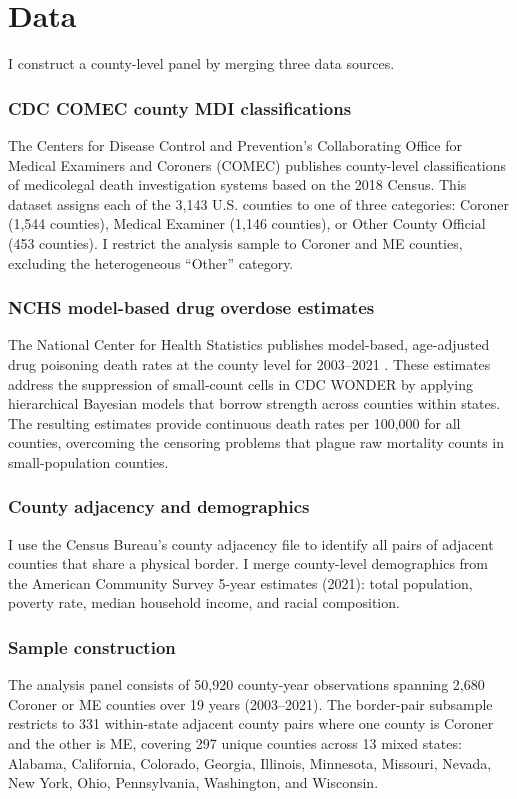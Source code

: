 \documentclass[12pt]{article}
\begin{document}
\section{Data}

I construct a county-level panel by merging three data sources.

\subsubsection*{CDC COMEC county MDI classifications} The Centers for Disease Control and Prevention's Collaborating Office for Medical Examiners and Coroners (COMEC) publishes county-level classifications of medicolegal death investigation systems based on the 2018 Census. This dataset assigns each of the 3,143 U.S. counties to one of three categories: Coroner (1,544 counties), Medical Examiner (1,146 counties), or Other County Official (453 counties). I restrict the analysis sample to Coroner and ME counties, excluding the heterogeneous ``Other'' category.

\subsubsection*{NCHS model-based drug overdose estimates} The National Center for Health Statistics publishes model-based, age-adjusted drug poisoning death rates at the county level for 2003--2021 \citep{nchs_model_od}. These estimates address the suppression of small-count cells in CDC WONDER by applying hierarchical Bayesian models that borrow strength across counties within states. The resulting estimates provide continuous death rates per 100,000 for all counties, overcoming the censoring problems that plague raw mortality counts in small-population counties.

\subsubsection*{County adjacency and demographics} I use the Census Bureau's county adjacency file to identify all pairs of adjacent counties that share a physical border. I merge county-level demographics from the American Community Survey 5-year estimates (2021): total population, poverty rate, median household income, and racial composition.

\subsubsection*{Sample construction} The analysis panel consists of 50,920 county-year observations spanning 2,680 Coroner or ME counties over 19 years (2003--2021). The border-pair subsample restricts to 331 within-state adjacent county pairs where one county is Coroner and the other is ME, covering 297 unique counties across 13 mixed states: Alabama, California, Colorado, Georgia, Illinois, Minnesota, Missouri, Nevada, New York, Ohio, Pennsylvania, Washington, and Wisconsin.
\end{document}
